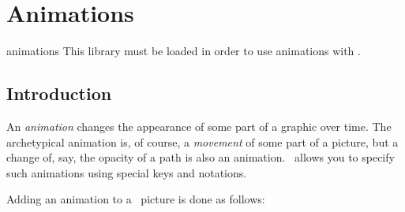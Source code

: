 %
%
%


\section{Animations}
\label{section-tikz-animations}


\begin{tikzlibrary}{animations}
  This library must be loaded in order to use animations with \tikzname.
\end{tikzlibrary}


\subsection{Introduction}

An \emph{animation} changes the appearance of some part of a graphic
over time. The archetypical animation is, of course, a \emph{movement} 
of some part of a picture, but a change of, say, the opacity of a path
is also an animation. \tikzname\ allows you to specify such animations
using special keys and notations.

\begin{codeexample}[width=8cm,animation list={0.7,1.4,2.1,2.8},animation scale=.25]
\end{codeexample}

Adding an animation to a \tikzname\ picture is done as follows:

